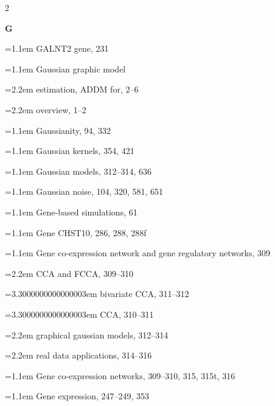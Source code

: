 \begin{multicols}{2}
\par{}\medskip\noindent\textbf{G}\par\nobreak\smallskip\nobreak
\noindent\hangindent=1.1em GALNT2 gene, 231\par
\noindent\hangindent=1.1em Gaussian graphic model\par
\noindent\hangindent=2.2em \hspace*{1.1em}estimation, ADDM for, 2--6\par
\noindent\hangindent=2.2em \hspace*{1.1em}overview, 1--2\par
\noindent\hangindent=1.1em Gaussianity, 94, 332\par
\noindent\hangindent=1.1em Gaussian kernels, 354, 421\par
\noindent\hangindent=1.1em Gaussian models, 312--314, 636\par
\noindent\hangindent=1.1em Gaussian noise, 104, 320, 581, 651\par
\noindent\hangindent=1.1em Gene-based simulations, 61\par
\noindent\hangindent=1.1em Gene CHST10, 286, 288, 288f\par
\noindent\hangindent=1.1em Gene co-expression network and gene regulatory networks, 309\par
\noindent\hangindent=2.2em \hspace*{1.1em}CCA and FCCA, 309--310\par
\noindent\hangindent=3.3000000000000003em \hspace*{2.2em}bivariate CCA, 311--312\par
\noindent\hangindent=3.3000000000000003em \hspace*{2.2em}CCA, 310--311\par
\noindent\hangindent=2.2em \hspace*{1.1em}graphical gaussian models, 312--314\par
\noindent\hangindent=2.2em \hspace*{1.1em}real data applications, 314--316\par
\noindent\hangindent=1.1em Gene co-expression networks, 309--310, 315, 315t, 316\par
\noindent\hangindent=1.1em Gene expression, 247--249, 353\par

\end{multicols}
